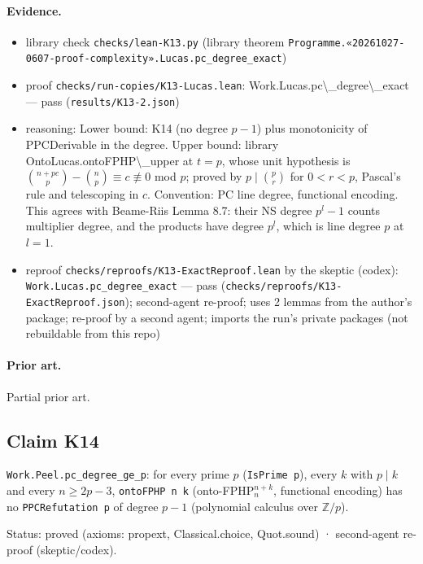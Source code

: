 \documentclass{article}
\begin{document}
\paragraph{Evidence.}
\begin{itemize}
\item library check \texttt{checks/lean-K13.py} (library theorem \texttt{Programme.«20261027-0607-proof-complexity».Lucas.pc\_degree\_exact})
\item proof \texttt{checks/run-copies/K13-Lucas.lean}: Work.Lucas.pc\textbackslash{}\_degree\textbackslash{}\_exact --- pass (\texttt{results/K13-2.json})
\item reasoning: Lower bound: K14 (no degree $p-1$) plus monotonicity of PPCDerivable in the degree. Upper bound: library OntoLucas.ontoFPHP\textbackslash{}\_upper at $t=p$, whose unit hypothesis is $\binom{n+pc}{p}-\binom np\equiv c\not\equiv0$ mod $p$; proved by $p\mid\binom pr$ for $0<r<p$, Pascal's rule and telescoping in $c$. Convention: PC line degree, functional encoding. This agrees with Beame-Riis Lemma 8.7: their NS degree $p^l-1$ counts multiplier degree, and the products have degree $p^l$, which is line degree $p$ at $l=1$.
\item reproof \texttt{checks/reproofs/K13-ExactReproof.lean} by the skeptic (codex): \texttt{Work.Lucas.pc\_degree\_exact} --- pass (\texttt{checks/reproofs/K13-ExactReproof.json}); second-agent re-proof; uses 2 lemmas from the author's package; re-proof by a second agent; imports the run's private packages (not rebuildable from this repo)
\end{itemize}

\paragraph{Prior art.} Partial prior art.

\subsection*{Claim K14}

\texttt{Work.Peel.pc\_degree\_ge\_p}: for every prime $p$ (\texttt{IsPrime p}), every $k$ with $p\mid k$ and every $n\ge2p-3$, \texttt{ontoFPHP n k} (onto-FPHP$^{n+k}_n$, functional encoding) has no \texttt{PPCRefutation p} of degree $p-1$ (polynomial calculus over $\mathbb Z/p$).

Status: proved (axioms: propext, Classical.choice, Quot.sound) · second-agent re-proof (skeptic/codex).
\end{document}
